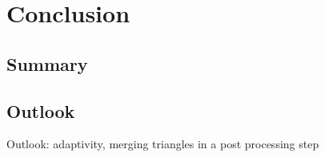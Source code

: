 \chapter{Conclusion}
\label{ch:conclusion}

\section{Summary}
\label{sec:summary}


\section{Outlook}
\label{sec:outlook}


Outlook:
adaptivity, merging triangles in a post processing step
